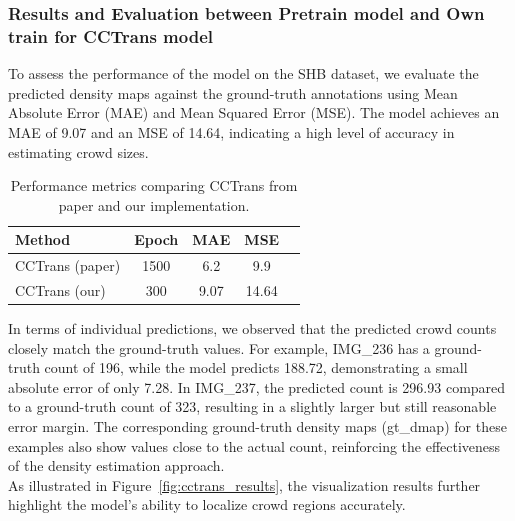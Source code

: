 \subsubsection{Results and Evaluation between Pretrain model and Own train for CCTrans model}
To assess the performance of the model on the SHB dataset, we evaluate the predicted density maps against the ground-truth annotations using Mean Absolute Error (MAE) and Mean Squared Error (MSE). The model achieves an MAE of 9.07 and an MSE of 14.64, indicating a high level of accuracy in estimating crowd sizes.\\
\begin{table}[H]
\centering
\begin{tabular}{@{}lcccc@{}}
\toprule
\textbf{Method} & \textbf{Epoch} & \textbf{MAE} & \textbf{MSE} \\ \midrule
CCTrans (paper) & 1500           & 6.2          & 9.9          \\
CCTrans (our)    & 300            & 9.07         & 14.64        \\
\end{tabular}
\caption{Performance metrics comparing CCTrans from paper and our implementation.}
\label{tab:cctrans_metrics}
\end{table}
In terms of individual predictions, we observed that the predicted crowd counts closely match the ground-truth values. For example, IMG\_236 has a ground-truth count of 196, while the model predicts 188.72, demonstrating a small absolute error of only 7.28. In IMG\_237, the predicted count is 296.93 compared to a ground-truth count of 323, resulting in a slightly larger but still reasonable error margin. The corresponding ground-truth density maps (gt\_dmap) for these examples also show values close to the actual count, reinforcing the effectiveness of the density estimation approach.\\
As illustrated in Figure~\ref{fig:cctrans_results}, the visualization results further highlight the model’s ability to localize crowd regions accurately.
